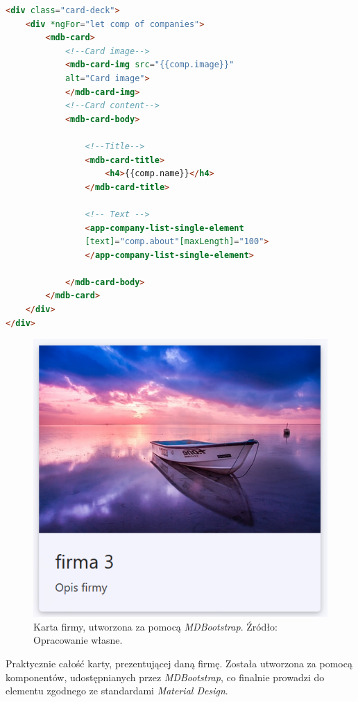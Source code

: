 \documentclass[twoside]{projektInzynierskiMS}
\numberwithin{figure}{section}
\begin{document}
\begin{lstlisting}[language=Html,caption=Przykładowe elementy utworzone na kanwie \textit{MDBootstrap}. Źródło: Opracowanie własne.,captionpos=b]
    <div class="card-deck">
    <div *ngFor="let comp of companies">
        <mdb-card>
            <!--Card image-->
            <mdb-card-img src="{{comp.image}}" 
            alt="Card image">
            </mdb-card-img>
            <!--Card content-->
            <mdb-card-body>

                <!--Title-->
                <mdb-card-title>
                    <h4>{{comp.name}}</h4>
                </mdb-card-title>

                <!-- Text -->
                <app-company-list-single-element 
                [text]="comp.about"[maxLength]="100">
                </app-company-list-single-element>

            </mdb-card-body>
        </mdb-card>
    </div>
</div>
\end{lstlisting}

\begin{figure}
    \centering
    \includegraphics[scale = 0.7]{images/kartaFirmy.png}
    \caption{Karta firmy, utworzona za pomocą \textit{MDBootstrap}. Źródło: Opracowanie własne.}
    \label{fig:karta_firmy}
\end{figure}
\newpage
Praktycznie całość karty, prezentującej daną firmę. Została utworzona za pomocą komponentów, udostępnianych przez \textit{MDBootstrap}, co finalnie prowadzi do elementu zgodnego ze standardami \textit{Material Design}. 
\end{document}
